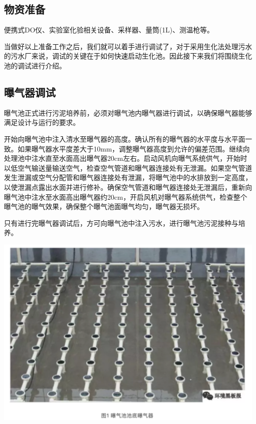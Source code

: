 \documentclass[
]{book}
\begin{document}
\hypertarget{ux7269ux8d44ux51c6ux5907}{%
\subsection{物资准备}\label{ux7269ux8d44ux51c6ux5907}}

便携式DO仪、实验室化验相关设备、采样器、量筒(1L)、测温枪等。

当做好以上准备工作之后，我们就可以着手进行调试了，对于采用生化法处理污水的污水厂来说，调试的关键在于如何快速启动生化池。因此接下来我们将围绕生化池的调试进行介绍。

\hypertarget{ux66ddux6c14ux5668ux8c03ux8bd5}{%
\subsection{曝气器调试}\label{ux66ddux6c14ux5668ux8c03ux8bd5}}

曝气池正式进行污泥培养前，必须对曝气池内曝气器进行调试，以确保曝气器能够满足设计与运行的要求。

开始向曝气池中注入清水至曝气器的高度。确认所有的曝气器的水平度与水平面一致。如果曝气器水平度差大于10mm，调整曝气器高度到允许的偏差范围。继续向处理池中注水直至水面高出曝气器20cm左右。启动风机向曝气系统供气，开始时以低空气输送量输送空气，检查空气管道和曝气器连接处有无泄漏。如果空气管道发生泄漏或空气分配管和曝气器连接处有泄漏，将曝气池中的水排放到一定高度，以使泄漏点露出水面并进行修补。确保空气管道和曝气器连接处无泄漏后，重新向曝气池中注水至水面高出曝气器约20cm，开启风机对曝气器系统供气，检查整个曝气池的曝气效果，确保整个曝气池面曝气均匀，曝气器无损坏。

只有进行完曝气器调试后，方可向曝气池中注入污水，进行曝气池污泥接种与培养。

\includegraphics[width=6.67in]{images/ao1}
\end{document}
